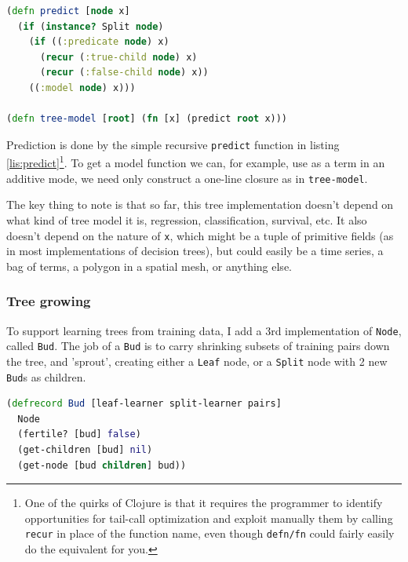\documentclass[10pt,openany]{article}
\numberwithin{definition}{section}
\numberwithin{example}{section}
\numberwithin{equation}{section}
\numberwithin{figure}{section}
\begin{document}
\begin{minipage}[t]{1\columnwidth}%
\begin{lstlisting}[caption={Generic prediction},label={lis:predict},language=clojure,tabsize=2]
(defn predict [node x]
  (if (instance? Split node)
    (if ((:predicate node) x)
      (recur (:true-child node) x)
      (recur (:false-child node) x))
	((:model node) x)))

(defn tree-model [root] (fn [x] (predict root x))) 
\end{lstlisting}
%
\end{minipage}

Prediction is done by the simple recursive \texttt{predict} function
in listing \ref{lis:predict}\footnote{One of the quirks of Clojure is that it requires the programmer to
identify opportunities for tail-call optimization and exploit manually
them by calling \texttt{recur} in place of the function name, even
though \texttt{defn/fn} could fairly easily do the equivalent for
you.}. To get a model function we can, for example, use as a term in an
additive mode, we need only construct a one-line closure as in \texttt{tree-model}.

The key thing to note is that so far, this tree implementation doesn't
depend on what kind of tree model it is, regression, classification,
survival, etc. It also doesn't depend on the nature of \texttt{x},
which might be a tuple of primitive fields (as in most implementations
of decision trees), but could easily be a time series, a bag of terms,
a polygon in a spatial mesh, or anything else.

\subsubsection{Tree growing}

To support learning trees from training data, I add a 3rd implementation
of \texttt{Node}, called \texttt{Bud}. The job of a \texttt{Bud} is
to carry shrinking subsets of training pairs down the tree, and 'sprout',
creating either a \texttt{Leaf} node, or a \texttt{Split} node with
2 new \texttt{Bud}s as children. 

\begin{minipage}[t]{1\columnwidth}%
\begin{lstlisting}[caption={Buds},label={lis:bud-defrecord},language=clojure,tabsize=2]
(defrecord Bud [leaf-learner split-learner pairs]
  Node
  (fertile? [bud] false)
  (get-children [bud] nil)
  (get-node [bud children] bud)) 
\end{lstlisting}
%
\end{minipage}
\end{document}
